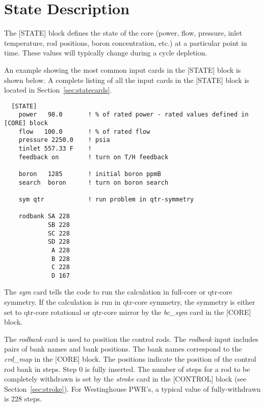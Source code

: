 %
%
\section{State Description}

The [STATE] block defines the state of the core
(power, flow, pressure, inlet temperature, rod positions, boron concentration, etc.)
at a particular point in time.
These values will typically change during a cycle depletion.

An example showing the most common input cards in the [STATE] block is shown below.
A complete listing of all the input cards in the [STATE] block is located in Section~\ref{sec:statecards}.

\begin{verbatim}
  [STATE]
    power   98.0       ! % of rated power - rated values defined in [CORE] block
    flow   100.0       ! % of rated flow
    pressure 2250.0    ! psia
    tinlet 557.33 F    !
    feedback on        ! turn on T/H feedback

    boron   1285       ! initial boron ppmB
    search  boron      ! turn on boron search

    sym qtr            ! run problem in qtr-symmetry

    rodbank SA 228
            SB 228
            SC 228
            SD 228
             A 228
             B 228
             C 228
             D 167
\end{verbatim}

The {\it sym} card tells the code to run the calculation in full-core or
qtr-core symmetry. If the calculation is run in qtr-core symmetry, the symmetry is either
set to qtr-core rotational or qtr-core mirror by the {\it bc\_sym} card in the [CORE] block.

The {\it rodbank} card is used to position the control rods. The {\it rodbank} input includes pairs of bank names
and bank positions.  The bank names correspond to the {\it crd\_map} in the [CORE] block.
The positions indicate the position of the control rod bank in steps.
Step 0 is fully inserted.
The number of steps for a rod to be completely withdrawn is set by the {\it stroke} card in
the [CONTROL] block (see Section~\ref{sec:stroke}). For Westinghouse PWR's, a typical value of fully-withdrawn is 228 steps.

